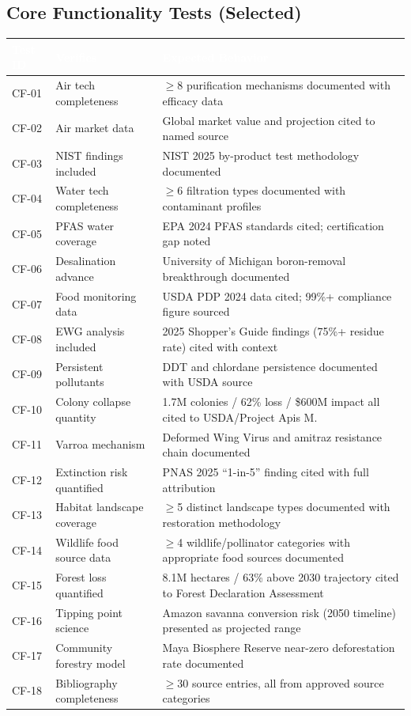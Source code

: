 \documentclass[11pt,letterpaper]{article}
\newcommand{\tableheader}[1]{\textbf{\sffamily\textcolor{white}{#1}}}
\begin{document}
\subsection{Core Functionality Tests (Selected)}

\begin{center}
\begin{tabularx}{\textwidth}{C{1.5cm}L{4.5cm}X}
\toprule
{}
\tableheader{Test ID} & \tableheader{Verifies} & \tableheader{Expected Behavior} \\
\midrule
CF-01 & Air tech completeness & $\geq$8 purification mechanisms documented with efficacy data \\
CF-02 & Air market data & Global market value and projection cited to named source \\
CF-03 & NIST findings included & NIST 2025 by-product test methodology documented \\
CF-04 & Water tech completeness & $\geq$6 filtration types documented with contaminant profiles \\
CF-05 & PFAS water coverage & EPA 2024 PFAS standards cited; certification gap noted \\
CF-06 & Desalination advance & University of Michigan boron-removal breakthrough documented \\
CF-07 & Food monitoring data & USDA PDP 2024 data cited; 99\%+ compliance figure sourced \\
CF-08 & EWG analysis included & 2025 Shopper's Guide findings (75\%+ residue rate) cited with context \\
CF-09 & Persistent pollutants & DDT and chlordane persistence documented with USDA source \\
CF-10 & Colony collapse quantity & 1.7M colonies / 62\% loss / \$600M impact all cited to USDA/Project Apis M. \\
CF-11 & Varroa mechanism & Deformed Wing Virus and amitraz resistance chain documented \\
CF-12 & Extinction risk quantified & PNAS 2025 ``1-in-5'' finding cited with full attribution \\
CF-13 & Habitat landscape coverage & $\geq$5 distinct landscape types documented with restoration methodology \\
CF-14 & Wildlife food source data & $\geq$4 wildlife/pollinator categories with appropriate food sources documented \\
CF-15 & Forest loss quantified & 8.1M hectares / 63\% above 2030 trajectory cited to Forest Declaration Assessment \\
CF-16 & Tipping point science & Amazon savanna conversion risk (2050 timeline) presented as projected range \\
CF-17 & Community forestry model & Maya Biosphere Reserve near-zero deforestation rate documented \\
CF-18 & Bibliography completeness & $\geq$30 source entries, all from approved source categories \\
\bottomrule
\end{tabularx}
\end{center}
\end{document}
